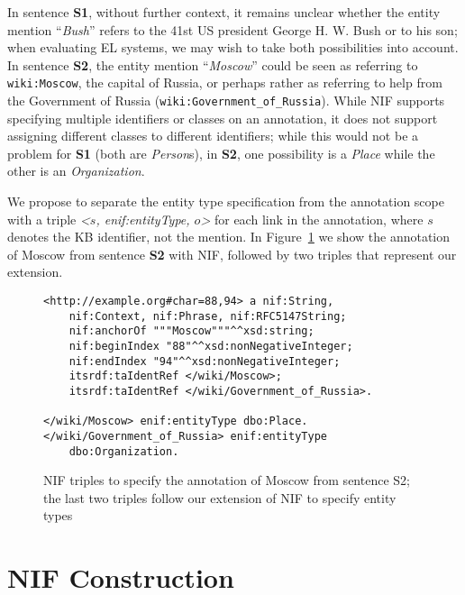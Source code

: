 \documentclass[sigconf]{acmart}
\begin{document}
In sentence \textbf{S1}, without further context, it remains unclear whether the entity mention ``\textit{Bush}'' refers to the 41st US president George H. W. Bush or to his son; when evaluating EL systems, we may wish to take both possibilities into account. In sentence \textbf{S2}, the entity mention ``\textit{Moscow}'' could be seen as referring to \texttt{wiki:Moscow}, the capital of Russia, or perhaps rather as referring to help from the Government of Russia (\texttt{wiki:Government\_of\_Russia}). While NIF supports specifying multiple identifiers or classes on an annotation, it does not support assigning different classes to different identifiers; while this would not be a problem for \textbf{S1} (both are \textit{Person}s), in \textbf{S2}, one possibility is a \textit{Place} while the other is an \textit{Organization}.

We propose to separate the entity type specification from the annotation scope with a triple \textit{<$s$, enif:entityType, $o$>} for each link in the annotation, where $s$ denotes the KB identifier, not the mention. In Figure~\ref{fig:nif} we show the annotation of Moscow from sentence \textbf{S2} with NIF, followed by two triples that represent our extension. 

\begin{figure}
\caption{NIF triples to specify the annotation of Moscow from sentence S2; the last two triples follow our extension of NIF to specify entity types}
\label{fig:nif}
\begin{Verbatim}[frame=single]
<http://example.org#char=88,94> a nif:String, 
    nif:Context, nif:Phrase, nif:RFC5147String;
    nif:anchorOf """Moscow"""^^xsd:string;
    nif:beginIndex "88"^^xsd:nonNegativeInteger;
    nif:endIndex "94"^^xsd:nonNegativeInteger;
    itsrdf:taIdentRef </wiki/Moscow>;
    itsrdf:taIdentRef </wiki/Government_of_Russia>.  
    
</wiki/Moscow> enif:entityType dbo:Place.
</wiki/Government_of_Russia> enif:entityType 
    dbo:Organization.
\end{Verbatim}
\end{figure}


\section{NIF Construction}
\end{document}
